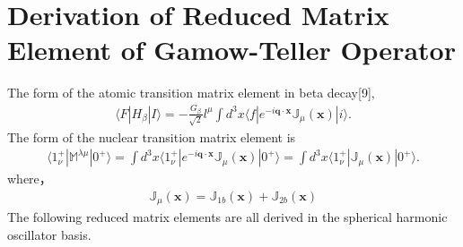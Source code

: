 \documentclass[master]{shnuthesis}
\begin{document}
\chapter{Derivation of Reduced Matrix Element of Gamow-Teller Operator}
The form of the atomic transition matrix element in beta decay[9],
\begin{align}
    \langle F| H_{\beta}|I\rangle=-\frac{G_{\beta}}{\sqrt{2}} l^{\mu} \int d^{3} x\langle f| e^{-i \bm{q} \cdot \boldsymbol{x}} \mathbb{J}_{\mu}(\boldsymbol{x})|i\rangle .
\end{align}
\indent The form of the nuclear transition matrix element is
\begin{align}
    \langle 1_\nu^+|\mathbb{M}^{\lambda\mu}|0^+\rangle = \int d^{3} x\langle 1_\nu^+| e^{-i \bm{q} \cdot \boldsymbol{x}} \mathbb{J}_{\mu}(\boldsymbol{x})|0^+\rangle = \int d^{3} x\langle 1_\nu^+| \mathbb{J}_{\mu}(\boldsymbol{x})|0^+\rangle.
\end{align}
where，
\begin{align}
    \mathbb{J}_{\mu}(\boldsymbol{x}) = \mathbb{J}_{1b}(\boldsymbol{x}) + \mathbb{J}_{2b}(\boldsymbol{x})
\end{align}
\indent The following reduced matrix elements are all derived in the spherical harmonic oscillator basis.
\end{document}
